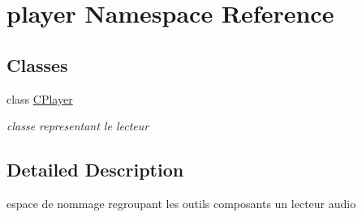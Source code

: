 \hypertarget{namespaceplayer}{}\section{player Namespace Reference}
\label{namespaceplayer}
\subsection*{Classes}
\begin{DoxyCompactItemize}
\item 
class \hyperlink{classplayer_1_1_c_player}{C\+Player}
\begin{DoxyCompactList}\small\item\em classe representant le lecteur \end{DoxyCompactList}\end{DoxyCompactItemize}


\subsection{Detailed Description}
espace de nommage regroupant les outils composants un lecteur audio 